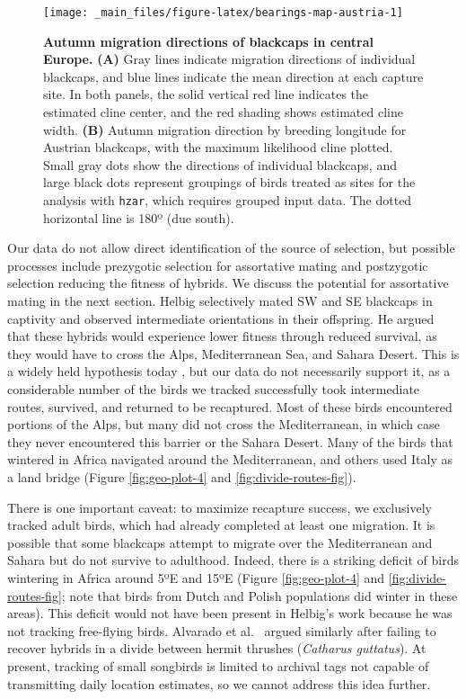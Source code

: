 \documentclass[a4paper, nobind]{templates/ociamthesis}
\begin{document}
\begin{figure}
\texttt{[image: \_main\_files/figure-latex/bearings-map-austria-1]} \caption{\textbf{Autumn migration directions of blackcaps in central Europe.} \textbf{(A)} Gray lines indicate migration directions of individual blackcaps, and blue lines indicate the mean direction at each capture site. In both panels, the solid vertical red line indicates the estimated cline center, and the red shading shows estimated cline width. \textbf{(B)} Autumn migration direction by breeding longitude for Austrian blackcaps, with the maximum likelihood cline plotted. Small gray dots show the directions of individual blackcaps, and large black dots represent groupings of birds treated as sites for the analysis with \texttt{hzar}, which requires grouped input data. The dotted horizontal line is 180º (due south).}\label{fig:bearings-map-austria}
\end{figure}

Our data do not allow direct identification of the source of selection, but possible processes include prezygotic selection for assortative mating and postzygotic selection reducing the fitness of hybrids. We discuss the potential for assortative mating in the next section. Helbig \autocite*{helbigInheritanceMigratoryDirection1991} selectively mated SW and SE blackcaps in captivity and observed intermediate orientations in their offspring. He argued that these hybrids would experience lower fitness through reduced survival, as they would have to cross the Alps, Mediterranean Sea, and Sahara Desert. This is a widely held hypothesis today \autocite{benschGeneticMorphologicalFeather2009,helbigInheritanceMigratoryDirection1991,irwinSiberianMigratoryDivides2005}, but our data do not necessarily support it, as a considerable number of the birds we tracked successfully took intermediate routes, survived, and returned to be recaptured. Most of these birds encountered portions of the Alps, but many did not cross the Mediterranean, in which case they never encountered this barrier or the Sahara Desert. Many of the birds that wintered in Africa navigated around the Mediterranean, and others used Italy as a land bridge (Figure \ref{fig:geo-plot-4} and \ref{fig:divide-routes-fig}).

There is one important caveat: to maximize recapture success, we exclusively tracked adult birds, which had already completed at least one migration. It is possible that some blackcaps attempt to migrate over the Mediterranean and Sahara but do not survive to adulthood. Indeed, there is a striking deficit of birds wintering in Africa around 5ºE and 15ºE (Figure \ref{fig:geo-plot-4} and \ref{fig:divide-routes-fig}; note that birds from Dutch and Polish populations did winter in these areas). This deficit would not have been present in Helbig's work because he was not tracking free-flying birds. Alvarado et al.~\autocite*{alvaradoIntegrativeTrackingMethods2014} argued similarly after failing to recover hybrids in a divide between hermit thrushes (\emph{Catharus guttatus}). At present, tracking of small songbirds is limited to archival tags not capable of transmitting daily location estimates, so we cannot address this idea further.
\end{document}
